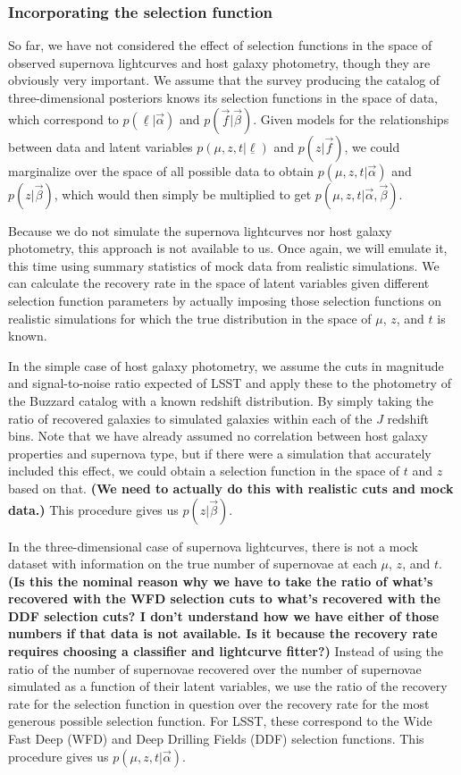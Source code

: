 \documentclass[12pt, onecolumn]{emulateapj}
\newcommand{\textul}{\underline}
\begin{document}
\subsubsection{Incorporating the selection function}
\label{sec:selectionfunctions}

So far, we have not considered the effect of selection functions in the space of observed supernova lightcurves and host galaxy photometry, though they are obviously very important.  We assume that the survey producing the catalog of three-dimensional posteriors knows its selection functions in the space of data, which correspond to $p(\textul{\ell} | \vec{\alpha})$ and $p(\vec{f} | \vec{\beta})$.  Given models for the relationships between data and latent variables $p(\mu, z, t | \textul{\ell})$ and $p(z | \vec{f})$, we could marginalize over the space of all possible data to obtain $p(\mu, z, t | \vec{\alpha})$ and $p(z | \vec{\beta})$, which would then simply be multiplied to get $p(\mu, z, t | \vec{\alpha}, \vec{\beta})$.  

Because we do not simulate the supernova lightcurves nor host galaxy photometry, this approach is not available to us.  Once again, we will emulate it, this time using summary statistics of mock data from realistic simulations.  We can calculate the recovery rate in the space of latent variables given different selection function parameters by actually imposing those selection functions on realistic simulations for which the true distribution in the space of $\mu$, $z$, and $t$ is known. 

In the simple case of host galaxy photometry, we assume the cuts in magnitude and signal-to-noise ratio expected of LSST and apply these to the photometry of the Buzzard catalog with a known redshift distribution.  By simply taking the ratio of recovered galaxies to simulated galaxies within each of the $J$ redshift bins.  Note that we have already assumed no correlation between host galaxy properties and supernova type, but if there were a simulation that accurately included this effect, we could obtain a selection function in the space of $t$ and $z$ based on that.  \textbf{(We need to actually do this with realistic cuts and mock data.)}  This procedure gives us $p(z | \vec{\beta})$.

In the three-dimensional case of supernova lightcurves, there is not a mock dataset with information on the true number of supernovae at each $\mu$, $z$, and $t$.  \textbf{(Is this the nominal reason why we have to take the ratio of what's recovered with the WFD selection cuts to what's recovered with the DDF selection cuts?  I don't understand how we have either of those numbers if that data is not available.  Is it because the recovery rate requires choosing a classifier and lightcurve fitter?)}  Instead of using the ratio of the number of supernovae recovered over the number of supernovae simulated as a function of their latent variables, we use the ratio of the recovery rate for the selection function in question over the recovery rate for the most generous possible selection function.  For LSST, these correspond to the Wide Fast Deep (WFD) and Deep Drilling Fields (DDF) selection functions.  This procedure gives us $p(\mu, z, t | \vec{\alpha})$.
\end{document}
